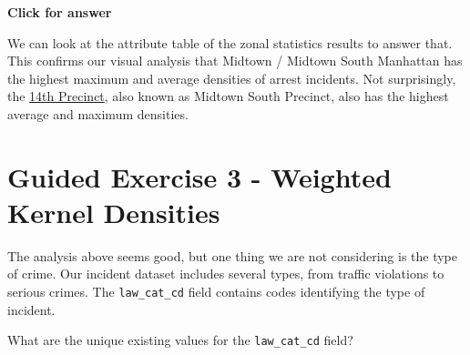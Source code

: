 \documentclass[
  letterpaper,
  DIV=11,
  numbers=noendperiod]{scrreprt}
\begin{document}
\begin{tcolorbox}[enhanced jigsaw, leftrule=.75mm, colframe=quarto-callout-important-color-frame, breakable, toprule=.15mm, bottomrule=.15mm, arc=.35mm, rightrule=.15mm, opacityback=0, colback=white, left=2mm]

\vspace{-3mm}\textbf{Click for answer}\vspace{3mm}

We can look at the attribute table of the zonal statistics results to
answer that. This confirms our visual analysis that Midtown / Midtown
South Manhattan has the highest maximum and average densities of arrest
incidents. Not surprisingly, the
\href{https://www.nyc.gov/site/nypd/bureaus/patrol/precincts/midtown-south-precinct.page}{14th
Precinct}, also known as Midtown South Precinct, also has the highest
average and maximum densities.

\end{tcolorbox}

\section{Guided Exercise 3 - Weighted Kernel
Densities}\label{guided-exercise-3---weighted-kernel-densities}

The analysis above seems good, but one thing we are not considering is
the type of crime. Our incident dataset includes several types, from
traffic violations to serious crimes. The \texttt{law\_cat\_cd} field
contains codes identifying the type of incident.

\begin{tcolorbox}[enhanced jigsaw, breakable, toptitle=1mm, colback=white, left=2mm, leftrule=.75mm, titlerule=0mm, colframe=quarto-callout-important-color-frame, opacityback=0, title=\textcolor{quarto-callout-important-color}{\faExclamation}\hspace{0.5em}{Stop and Think}, toprule=.15mm, opacitybacktitle=0.6, bottomtitle=1mm, colbacktitle=quarto-callout-important-color!10!white, bottomrule=.15mm, coltitle=black, rightrule=.15mm, arc=.35mm]

What are the unique existing values for the \texttt{law\_cat\_cd} field?

\end{tcolorbox}
\end{document}
